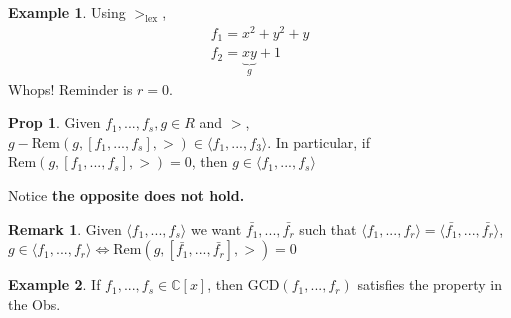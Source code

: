 \documentclass{article}
\theoremstyle{definition}
\newtheorem*{obs}{Remark}
\newtheorem*{prop}{Prop}
\newtheorem{ex}{Example}
\newcommand{\C}{\mathbb{C}}
\newcommand{\Rem}{\text{Rem}}
\newcommand{\lex}{\text{lex}}
\newcommand{\GCD}{\text{GCD}}
\begin{document}
\begin{ex} Using $>_\lex$,
	\begin{align*}
		f_1=x^2+y^2+y\\
		f_2=\underbrace{xy}_g+1	\end{align*}
		Whops! Reminder is $r=0$.
\end{ex}
\begin{prop}
	Given $f_1,...,f_s,g\in R$ and $>$, $g-\Rem(g,[f_1,...,f_s],>)\in\langle f_1,...,f_3\rangle$. In particular, if $\Rem(g,[f_1,...,f_s],>)=0$, then $g\in\langle f_1,...,f_s\rangle$
\end{prop}
Notice \textbf{the opposite does not hold.}
\begin{obs}
	Given $\langle f_1,...,f_s\rangle$ we want $\bar{f_1},...,\bar{f_r}$ such that $\langle f_1,...,f_r\rangle=\langle \bar{f_1},...,\bar{f_r}\rangle$, $g\in\langle f_1,...,f_r\rangle\iff\Rem(g,[\bar{f_1},...,\bar{f_r}],>)=0$
\end{obs}
\begin{ex}
	If $f_1,...,f_s\in\C[x]$, then $\GCD(f_1,...,f_r)$ satisfies the property in the Obs.
\end{ex}
\end{document}
